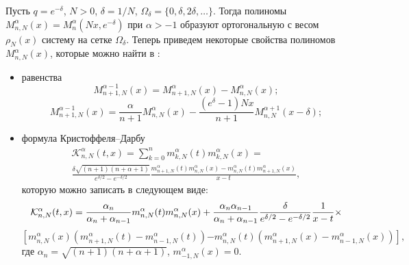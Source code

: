 Пусть $q=e^{-\delta}$, $N>0$, $\delta=1/N$, $\Omega_\delta=\{0,\delta,2\delta,\ldots \}$. Тогда полиномы $M_{n,N}^{\alpha}(x)=M_{n}^{\alpha}(Nx,e^{-\delta})$ при $\alpha>-1$ образуют ортогональную с весом $\rho_N(x)$ систему на сетке $\Omega_\delta$. Теперь приведем некоторые свойства полиномов $M_{n,N}^{\alpha}(x)$, которые можно найти в \cite{RamSharMnog}:
\begin{itemize}
\item
равенства
\begin{equation*}
M_{n+1,N}^{\alpha-1}(x)=M_{n+1,N}^\alpha(x)-M_{n,N}^\alpha(x);
\end{equation*}
\begin{equation*}
M_{n+1,N}^{\alpha-1}(x)=\frac{\alpha}{n+1}M_{n,N}^\alpha(x)-\frac{(e^\delta-1)Nx}{n+1}M_{n,N}^{\alpha+1}(x-\delta);
\end{equation*}
\item
формула Кристоффеля--Дарбу
\begin{multline}\label{Ram-eq2}
\mathcal{K}_{n,N}^{\alpha}(t,x)=\sum_{k=0}^n m_{k,N}^{\alpha}(t)m_{k,N}^{\alpha}(x)=\\
\frac{\delta\sqrt{(n+1)(n+\alpha+1)}}
{e^{\delta/2}-e^{-\delta/2}}
\frac{m_{n+1,N}^\alpha(t)m_{n,N}^\alpha(x)-
m_{n,N}^\alpha(t)m_{n+1,N}^\alpha(x)}{x-t},
\end{multline}
которую можно записать \cite{Ram3, Ram4} в следующем виде:
$$
\mathcal{K}_{n,N}^\alpha(t,x)={\alpha_n\over \alpha_n+\alpha_{n-1}}m_{n,N}^{\alpha}(t)m_{n,N}^{\alpha}(x)+
{\alpha_n\alpha_{n-1}\over \alpha_n+\alpha_{n-1}}{\delta\over e^{\delta/2}-e^{-\delta/2}} {1\over x-t}\times
$$
\begin{equation*}
\left[m_{n,N}^\alpha(x)\left(m_{n+1,N}^\alpha(t)-m_{n-1,N}^\alpha(t)\right)\right.
\left.-m_{n,N}^\alpha(t)\left(m_{n+1,N}^\alpha(x)-m_{n-1,N}^\alpha(x)
\right)\right],
\end{equation*}
где $\alpha_n=\sqrt{(n+1)(n+\alpha+1)}$, $m_{-1,N}^\alpha(x)=0$.
\end{itemize}

